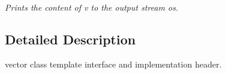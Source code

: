 \begin{DoxyCompactItemize}
\begin{DoxyCompactList}\small\item\em Prints the content of v to the output stream os. \end{DoxyCompactList}\end{DoxyCompactItemize}


\subsection{Detailed Description}
vector class template interface and implementation header. 

